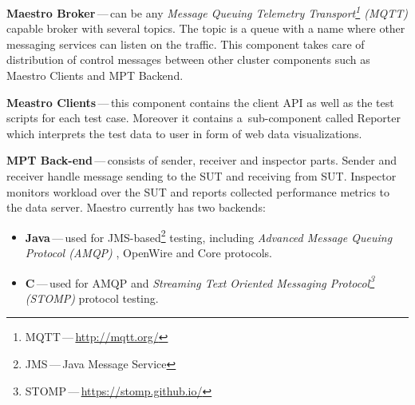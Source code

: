 \begin{description}
	\setlength\itemsep{0em}
	\item \textbf{Maestro Broker}\,---\,can be any \emph{Message Queuing Telemetry Transport\footnote{MQTT\,---\,\url{http://mqtt.org/}} (MQTT)} capable broker with several topics. The topic is a queue with a name where other messaging services can listen on the traffic. This component takes care of distribution of control messages between other cluster components such as Maestro Clients and MPT Backend.
	\item \textbf{Meastro Clients}\,---\,this component contains the client API as well as the test scripts for each test case. Moreover it contains a~sub-component called Reporter which interprets the test data to user in form of web data visualizations.
	\item \textbf{MPT Back-end}\,---\,consists of sender, receiver and inspector parts. Sender and receiver handle message sending to the SUT and receiving from SUT. Inspector monitors workload over the SUT and reports collected performance metrics to the data server. Maestro currently has two backends:
	\begin{itemize}
		\item \textbf{Java}\,---\,used for JMS-based\footnote{JMS\,---\,Java Message Service} testing, including \emph{Advanced Message Queuing Protocol (AMQP)} \cite{OASIS:AMQP}, OpenWire and Core protocols.
		\item \textbf{C}\,---\,used for AMQP and \emph{Streaming Text Oriented Messaging Protocol\footnote{STOMP\,---\,\url{https://stomp.github.io/}} (STOMP)} protocol testing.
	\end{itemize}
\end{description}

